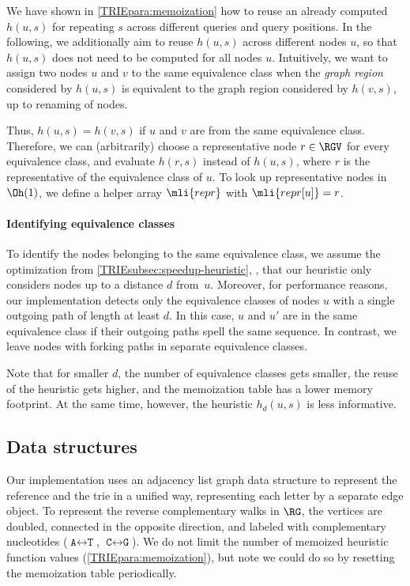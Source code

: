 We have shown in \cref{TRIEpara:memoization} how to reuse an already computed
$h(u,s)$ for repeating $s$ across different queries and query positions. In the
following, we additionally aim to reuse $h(u,s)$ across different nodes $u$, so
that $h(u,s)$ does not need to be computed for all nodes $u$. Intuitively, we
want to assign two nodes $u$ and $v$ to the same equivalence class when the
\emph{graph region} considered by $h(u,s)$ is equivalent to the graph region
considered by $h(v,s)$, up to renaming of nodes.

Thus, $h(u,s)=h(v,s)$ if $u$ and $v$ are from the same equivalence class.
Therefore, we can (arbitrarily) choose a representative node $r \in \RGV$ for
every equivalence class, and evaluate $h(r,s)$ instead of $h(u,s)$, where $r$ is
the representative of the equivalence class of $u$. To look up representative
nodes in $\Oh(1)$, we define a helper array $\mli{repr}$ with $\mli{repr[u]} =
r$.

\paragraph{Identifying equivalence classes}
To identify the nodes belonging to the same equivalence class, we assume the
optimization from \cref{TRIEsubsec:speedup-heuristic}, \ie, that our heuristic only
considers nodes up to a distance $d$ from~$u$.
%
Moreover, for performance reasons, our implementation detects only the
equivalence classes of nodes $u$ with a single outgoing path of length at least
$d$.
%
In this case, $u$ and $u'$ are in the same equivalence class if their outgoing
paths spell the same sequence.
%
In contrast, we leave nodes with forking paths in separate equivalence classes.

Note that for smaller $d$, the number of equivalence classes gets smaller, the
reuse of the heuristic gets higher, and the memoization table has a lower memory
footprint. At the same time, however, the heuristic $h_d(u,s)$ is less
informative.

\subsection{Data structures}
Our \astarix implementation uses an adjacency list graph data structure to
represent the reference and the trie in a unified way, representing each letter
by a separate edge object. To represent the reverse complementary walks in
$\RG$, the vertices are doubled, connected in the opposite direction, and
labeled with complementary nucleotides ($\texttt{A} \leftrightarrow \texttt{T}$,
$\texttt{C} \leftrightarrow \texttt{G}$). We do not limit the number of memoized
heuristic function values (\cref{TRIEpara:memoization}), but note we could do so
by resetting the memoization table periodically.